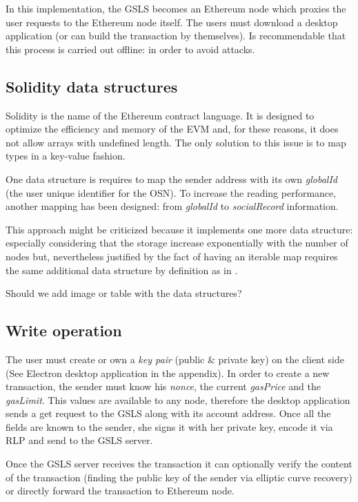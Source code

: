 In this implementation, the GSLS becomes an Ethereum node which proxies the user requests to the Ethereum node itself.
The users must download a desktop application (or can build the transaction by themselves). Is recommendable that this process is carried out offline: in order to avoid attacks.

\subsection{Solidity data structures}
Solidity is the name of the Ethereum contract language. It is designed to optimize the efficiency and memory of the EVM and, for these reasons, it does not allow arrays with undefined length.
The only solution to this issue is to map types in a key-value fashion.

One data structure is requires to map the sender address with its own \textit{globalId} (the user unique identifier for the OSN).  To increase the reading performance, another mapping has been designed: from \textit{globalId} to \textit{socialRecord} information.

This approach might be criticized because it implements one more data structure: especially considering that the storage increase exponentially with the number of nodes but, nevertheless justified by the fact of having an iterable map requires the same additional data structure by definition as in \cite{datastructure_solidity}.

\begin{notation}
  Should we add image or table with the data structures?
\end{notation}


\subsection{Write operation}
The user must create or own a \textit{key pair} (public \& private key) on the client side (See Electron desktop application in the appendix).
In order to create a new transaction, the sender must know his \textit{nonce}, the current \textit{gasPrice} and the \textit{gasLimit}. This values are available to any node, therefore the desktop application sends a get request to the GSLS along with its account address. Once all the fields are known to the sender, she signs it with her private key, encode it via RLP and send to the GSLS server.

Once the GSLS server receives the transaction it can optionally verify the content of the transaction (finding the public key of the sender via elliptic curve recovery) or directly forward the transaction to Ethereum node.

